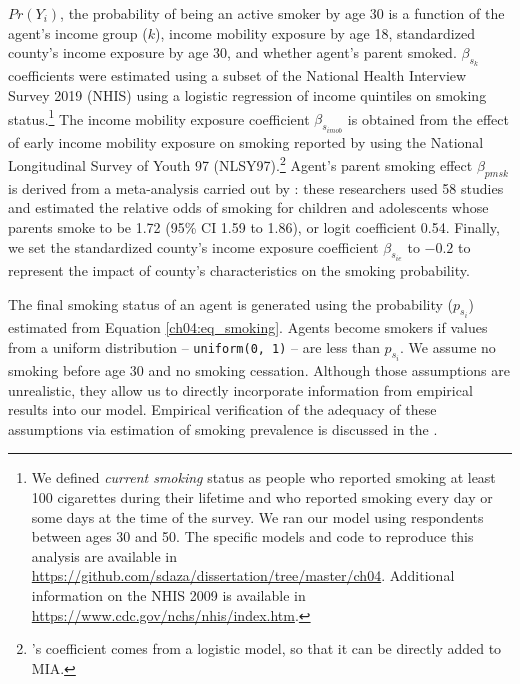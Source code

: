 \documentclass[class=article, crop=false, 12pt]{standalone}
\begin{document}
$Pr(Y_i)$, the probability of being an active smoker by age 30 is a function of the agent's income group ($k$), income mobility exposure by age 18, standardized county's income exposure by age 30, and whether agent's parent smoked. $\beta_{s_{k}}$ coefficients were estimated using a subset of the National Health Interview Survey 2019 (NHIS) using a logistic regression of income quintiles on smoking status.\footnote{We defined \emph{current smoking} status as people who reported smoking at least 100 cigarettes during their lifetime and who reported smoking every day or some days at the time of the survey. We ran our model using respondents between ages 30 and 50. The specific models and code to reproduce this analysis are available in \url{https://github.com/sdaza/dissertation/tree/master/ch04}. Additional information on the NHIS 2009 is available in \url{https://www.cdc.gov/nchs/nhis/index.htm}.}
The income mobility exposure coefficient $\beta_{s_{imob}}$ is obtained from the effect of early income mobility exposure on smoking reported by \citet{daza2021} using the National Longitudinal Survey of Youth 97 (NLSY97).\footnote{\citet{daza2021}'s coefficient comes from a logistic model, so that it can be directly added to MIA.}
Agent's parent smoking effect $\beta_{pmsk}$ is derived from a meta-analysis carried out by \citet{leonardi-bee2011}: these researchers used 58 studies and estimated the relative odds of smoking for children and adolescents whose parents smoke to be 1.72 (95\% CI 1.59 to 1.86), or logit coefficient 0.54. Finally, we set the standardized county's income exposure coefficient $\beta_{s_{ie}}$ to $-0.2$ to represent the impact of county's characteristics on the smoking probability. 

The final smoking status of an agent is generated using the probability ($p_{s_{i}}$) estimated from Equation \ref{ch04:eq_smoking}. Agents become smokers if values from a uniform distribution -- \texttt{uniform(0, 1)} -- are less than $p_{s_{i}}$. We assume no smoking before age 30 and no smoking cessation. Although those assumptions are unrealistic, they allow us to directly incorporate information from empirical results into our model. Empirical verification of the adequacy of these assumptions  via estimation of smoking prevalence is discussed in the \textit{}. 
\end{document}
